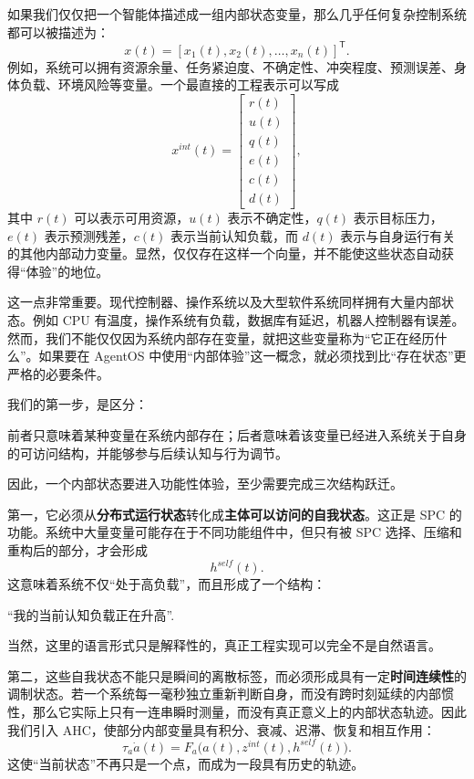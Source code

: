 如果我们仅仅把一个智能体描述成一组内部状态变量，那么几乎任何复杂控制系统都可以被描述为：
\[
x(t)
=
[x_1(t),x_2(t),\ldots,x_n(t)]^{\mathsf T}.
\]
例如，系统可以拥有资源余量、任务紧迫度、不确定性、冲突程度、预测误差、身体负载、环境风险等变量。一个最直接的工程表示可以写成
\[
x^{int}(t)
=
\begin{bmatrix}
r(t)\\
u(t)\\
q(t)\\
e(t)\\
c(t)\\
d(t)
\end{bmatrix},
\]
其中 $r(t)$ 可以表示可用资源，$u(t)$ 表示不确定性，$q(t)$ 表示目标压力，$e(t)$ 表示预测残差，$c(t)$ 表示当前认知负载，而 $d(t)$ 表示与自身运行有关的其他内部动力变量。显然，仅仅存在这样一个向量，并不能使这些状态自动获得``体验''的地位。

这一点非常重要。现代控制器、操作系统以及大型软件系统同样拥有大量内部状态。例如 CPU 有温度，操作系统有负载，数据库有延迟，机器人控制器有误差。然而，我们不能仅仅因为系统内部存在变量，就把这些变量称为``它正在经历什么''。如果要在 AgentOS 中使用``内部体验''这一概念，就必须找到比``存在状态''更严格的必要条件。

我们的第一步，是区分：
\begin{statementbox}
\centering
{}
\end{statementbox}
前者只意味着某种变量在系统内部存在；后者意味着该变量已经进入系统关于自身的可访问结构，并能够参与后续认知与行为调节。

因此，一个内部状态要进入功能性体验，至少需要完成三次结构跃迁。

第一，它必须从\textbf{分布式运行状态}转化成\textbf{主体可以访问的自我状态}。这正是 SPC 的功能。系统中大量变量可能存在于不同功能组件中，但只有被 SPC 选择、压缩和重构后的部分，才会形成
\[
h^{self}(t).
\]
这意味着系统不仅``处于高负载''，而且形成了一个结构：
\begin{statementbox}
``我的当前认知负载正在升高''.
\end{statementbox}
当然，这里的语言形式只是解释性的，真正工程实现可以完全不是自然语言。

第二，这些自我状态不能只是瞬间的离散标签，而必须形成具有一定\textbf{时间连续性}的调制状态。若一个系统每一毫秒独立重新判断自身，而没有跨时刻延续的内部惯性，那么它实际上只有一连串瞬时测量，而没有真正意义上的内部状态轨迹。因此我们引入 AHC，使部分内部变量具有积分、衰减、迟滞、恢复和相互作用：
\[
\tau_a\dot a(t)
=
F_a\big(
a(t),
z^{int}(t),
h^{self}(t)
\big).
\]
这使``当前状态''不再只是一个点，而成为一段具有历史的轨迹。

